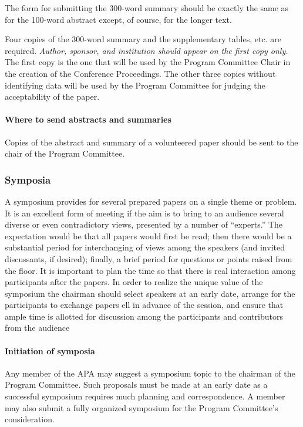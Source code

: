 {{The form for submitting the 300-word summary should be exactly the same as for the 100-word abstract except, of course, for the longer text.

Four copies of the 300-word summary and the supplementary tables, etc. are required. \emph{Author, sponsor, and institution should appear on the first copy only.} The first copy is the one that will be used by the Program Committee Chair in the creation of the Conference Proceedings. The other three copies without identifying data will be used by the Program Committee for judging the acceptability of the paper.

\paragraph{Where to send abstracts and summaries}
\label{wheretosendabstractsandsummaries}

Copies of the abstract and summary of a volunteered paper should be sent to the chair of the Program Committee.

\subsubsection{Symposia}
\label{symposia}

A symposium provides for several prepared papers on a single theme or problem. It is an excellent form of meeting if the aim is to bring to an audience several diverse or even contradictory views, presented by a number of ``experts.'' The expectation would be that all papers would first be read; then there would be a substantial period for interchanging of views among the speakers (and invited discussants, if desired); finally, a brief period for questions or points raised from the floor. It is important to plan the time so that there is real interaction among participants after the papers. In order to realize the unique value of the symposium the chairman should select speakers at an early date, arrange for the participants to exchange papers ell in advance of the session, and ensure that ample time is allotted for discussion among the participants and contributors from the audience

\paragraph{Initiation of symposia}
\label{initiationofsymposia}

Any member of the APA may suggest a symposium topic to the chairman of the Program Committee. Such proposals must be made at an early date as a successful symposium requires much planning and correspondence. A member may also submit a fully organized symposium for the Program Committee's consideration.

}}

